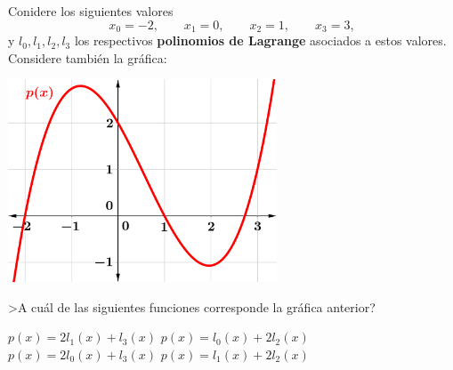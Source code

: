 \begin{pregunta}
\begin{cuerpo}
Conidere los siguientes valores
$$
x_0=-2,\qquad x_1=0,\qquad x_2=1,\qquad x_3=3,
$$
y $l_0, l_1, l_2, l_3$ los respectivos \textbf{polinomios de Lagrange} asociados a estos valores. Considere tambi\'en la gr\'afica:
\medskip

\centerline{\includegraphics[width=0.6\textwidth]{./img/lagrangeEP.png}}
\medskip

>A cu\'al de las siguientes funciones corresponde la gr\'afica anterior?
\end{cuerpo}
\begin{multicols}{2}
\begin{alternativas}
{$p(x)=2l_1(x)+l_3(x)$}
{$p(x)=l_0(x)+2l_2(x)$}
{$p(x)=2l_0(x)+l_3(x)$}
{$p(x)=l_1(x)+2l_2(x)$}
\end{alternativas}
\end{multicols}
\justificacion{0cm}
\end{pregunta}
